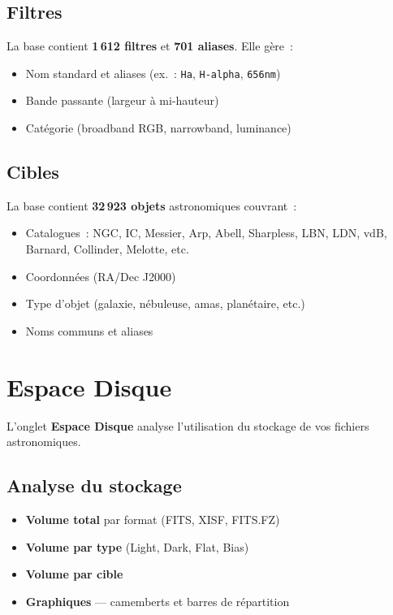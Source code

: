 \documentclass[a4paper,11pt]{article}
\begin{document}
\subsection{Filtres}

La base contient \textbf{1\,612 filtres} et \textbf{701 aliases}. Elle g\`{e}re~:

\begin{itemize}
    \item Nom standard et aliases (ex.~: \texttt{Ha}, \texttt{H-alpha}, \texttt{656nm})
    \item Bande passante (largeur \`{a} mi-hauteur)
    \item Cat\'{e}gorie (broadband RGB, narrowband, luminance)
\end{itemize}

\subsection{Cibles}

La base contient \textbf{32\,923 objets} astronomiques couvrant~:

\begin{itemize}
    \item Catalogues~: NGC, IC, Messier, Arp, Abell, Sharpless, LBN, LDN, vdB, Barnard, Collinder, Melotte, etc.
    \item Coordonn\'{e}es (RA/Dec J2000)
    \item Type d'objet (galaxie, n\'{e}buleuse, amas, plan\'{e}taire, etc.)
    \item Noms communs et aliases
\end{itemize}


\section{Espace Disque}
\label{sec:disque}

L'onglet \textbf{Espace Disque} analyse l'utilisation du stockage de vos fichiers astronomiques.

\subsection{Analyse du stockage}

\begin{itemize}
    \item \textbf{Volume total} par format (FITS, XISF, FITS.FZ)
    \item \textbf{Volume par type} (Light, Dark, Flat, Bias)
    \item \textbf{Volume par cible}
    \item \textbf{Graphiques} --- camemberts et barres de r\'{e}partition
\end{itemize}
\end{document}
